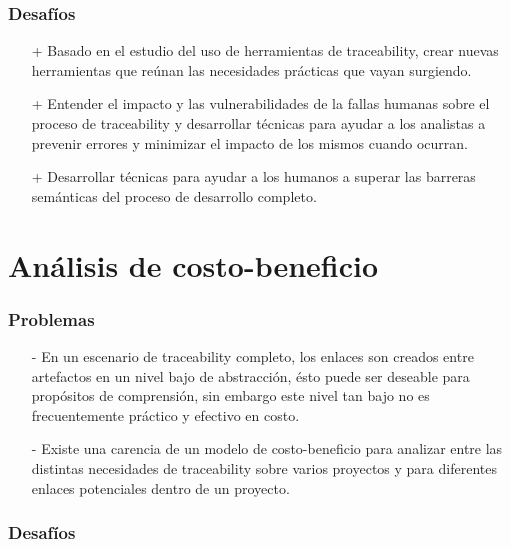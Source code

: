 \documentclass[a4paper,12pt,oneside]{book}
\begin{document}
\subsubsection{Desafíos}

\begin{itemize}

\item[+]     Basado en el estudio del uso de herramientas de traceability, crear nuevas herramientas que reúnan las necesidades prácticas que vayan surgiendo.

\item[+]    Entender el impacto y las vulnerabilidades de la fallas humanas sobre el proceso de traceability y desarrollar técnicas para ayudar a los analistas a prevenir errores y minimizar el impacto de los mismos cuando ocurran.

\item[+]    Desarrollar técnicas para ayudar a los humanos a superar las barreras semánticas del proceso de desarrollo completo.

\end{itemize}

\section{Análisis de costo-beneficio}

\subsubsection{Problemas}

\begin{itemize}

\item[-]     En un escenario de traceability completo, los enlaces son creados entre artefactos en un nivel bajo de abstracción, ésto puede ser deseable para propósitos de comprensión, sin embargo este nivel tan bajo no es frecuentemente práctico y efectivo en costo.

\item[-]    Existe una carencia de un modelo de costo-beneficio para analizar entre las distintas necesidades de traceability sobre varios proyectos y para diferentes enlaces potenciales dentro de un proyecto.

\end{itemize}

\subsubsection{Desafíos}
\end{document}
